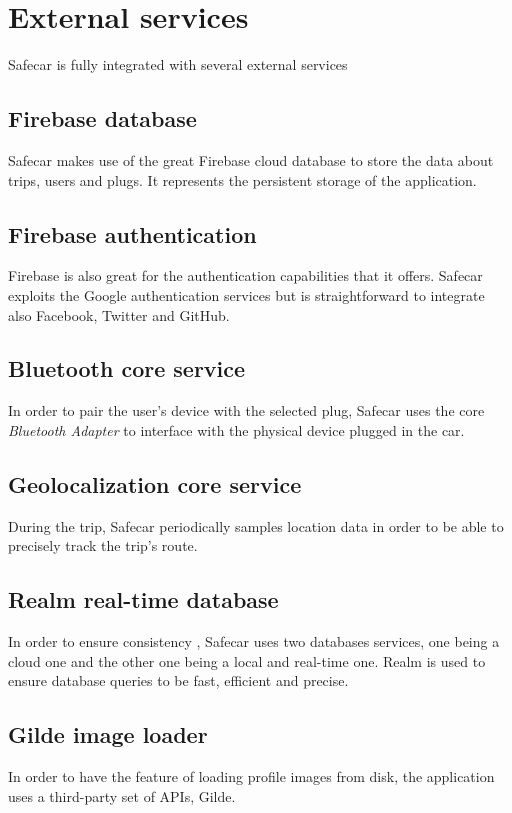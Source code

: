 \section{External services}
Safecar is fully integrated with several external services

\subsection{Firebase database}
Safecar makes use of the great Firebase cloud database to store the data about trips, users and plugs. It represents the persistent storage of the application.

\subsection{Firebase authentication}
Firebase is also great for the authentication capabilities that it offers. Safecar exploits the Google authentication services but is straightforward to integrate also Facebook, Twitter and GitHub.

\subsection{Bluetooth core service}
In order to pair the user's device with the selected plug, Safecar uses the core \textit{Bluetooth Adapter} to interface with the physical device plugged in the car.

\subsection{Geolocalization core service}
During the trip, Safecar periodically samples location data in order to be able to precisely track the trip's route.

\subsection{Realm real-time database}
In order to ensure consistency , Safecar uses two databases services, one being a cloud one and the other one being a local and real-time one. Realm is used to ensure database queries to be fast, efficient and precise.

\subsection{Gilde image loader}
In order to have the feature of loading profile images from disk, the application uses a third-party set of APIs, Gilde.

